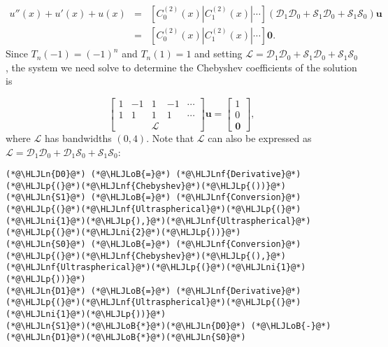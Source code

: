 \documentclass[12pt,landscape]{article}
\newcommand{\HLJLn}[1]{#1}
\newcommand{\HLJLnf}[1]{\textcolor[RGB]{66,102,213}{#1}}
\newcommand{\HLJLni}[1]{\textcolor[RGB]{59,151,46}{#1}}
\newcommand{\HLJLoB}[1]{\textcolor[RGB]{102,102,102}{\textbf{#1}}}
\newcommand{\HLJLp}[1]{#1}
\begin{document}
{\begin{eqnarray*}
u''(x) + u'(x)  + u(x)  &=& \left[ C_0^{(2)}(x) | C_1^{(2)}(x) | \cdots \right]\left(\mathcal{D}_1\mathcal{D}_0  + \mathcal{S}_1\mathcal{D}_0 + \mathcal{S}_1\mathcal{S}_0  \right) \mathbf{u} \\
 &=& \left[ C_0^{(2)}(x) | C_1^{(2)}(x) | \cdots \right]\mathbf{0}.
 \end{eqnarray*}
Since $T_n(-1) = (-1)^n$ and $T_n(1) = 1$ and setting $\mathcal{L} = \mathcal{D}_1\mathcal{D}_0  + \mathcal{S}_1\mathcal{D}_0 + \mathcal{S}_1\mathcal{S}_0$, the system we need solve to determine the Chebyshev coefficients of the solution is

\[
\begin{bmatrix}
1 & -1 &  1 & -1 & \cdots  \\
1 & 1  &  1 & 1  & \cdots \\
& &\mathcal{L} & &
\end{bmatrix}\mathbf{u} = \begin{bmatrix} 1  \\
0 \\
\mathbf{0}
\end{bmatrix},
\]
where $\mathcal{L}$ has bandwidths $(0,4)$. Note that $\mathcal{L}$ can also be expressed as $\mathcal{L} = \mathcal{D}_1\mathcal{D}_0  + \mathcal{D}_1\mathcal{S}_0 + \mathcal{S}_1\mathcal{S}_0$:


\begin{lstlisting}
(*@\HLJLn{D0}@*) (*@\HLJLoB{=}@*) (*@\HLJLnf{Derivative}@*)(*@\HLJLp{(}@*)(*@\HLJLnf{Chebyshev}@*)(*@\HLJLp{())}@*)
(*@\HLJLn{S1}@*) (*@\HLJLoB{=}@*) (*@\HLJLnf{Conversion}@*)(*@\HLJLp{(}@*)(*@\HLJLnf{Ultraspherical}@*)(*@\HLJLp{(}@*)(*@\HLJLni{1}@*)(*@\HLJLp{),}@*)(*@\HLJLnf{Ultraspherical}@*)(*@\HLJLp{(}@*)(*@\HLJLni{2}@*)(*@\HLJLp{))}@*)
(*@\HLJLn{S0}@*) (*@\HLJLoB{=}@*) (*@\HLJLnf{Conversion}@*)(*@\HLJLp{(}@*)(*@\HLJLnf{Chebyshev}@*)(*@\HLJLp{(),}@*)(*@\HLJLnf{Ultraspherical}@*)(*@\HLJLp{(}@*)(*@\HLJLni{1}@*)(*@\HLJLp{))}@*)
(*@\HLJLn{D1}@*) (*@\HLJLoB{=}@*) (*@\HLJLnf{Derivative}@*)(*@\HLJLp{(}@*)(*@\HLJLnf{Ultraspherical}@*)(*@\HLJLp{(}@*)(*@\HLJLni{1}@*)(*@\HLJLp{))}@*)
(*@\HLJLn{S1}@*)(*@\HLJLoB{*}@*)(*@\HLJLn{D0}@*) (*@\HLJLoB{-}@*) (*@\HLJLn{D1}@*)(*@\HLJLoB{*}@*)(*@\HLJLn{S0}@*)
\end{lstlisting}

}
\end{document}
